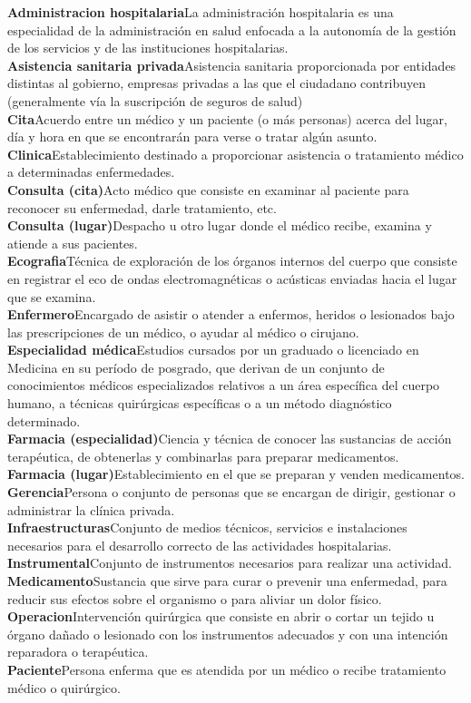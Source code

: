\documentclass[12pt,a4paper]{article}
\newcommand{\term}[2]{\textbf{#1}\quad#2\\}
\begin{document}
	\term{Administracion hospitalaria}{La administración hospitalaria es una especialidad de la administración en salud enfocada a la autonomía de la gestión de los servicios y de las instituciones hospitalarias.}
	\term{Asistencia sanitaria privada}{Asistencia sanitaria proporcionada por entidades distintas al gobierno, empresas privadas a las que el ciudadano contribuyen (generalmente vía la suscripción de seguros de salud)}
	\term{Cita}{Acuerdo entre un médico y un paciente (o más personas) acerca del lugar, día y hora en que se encontrarán para verse o tratar algún asunto.}
	\term{Clinica}{Establecimiento destinado a proporcionar asistencia o tratamiento médico a determinadas enfermedades.}
	\term{Consulta (cita)}{Acto médico que consiste en examinar al paciente para reconocer su enfermedad, darle tratamiento, etc.}
	\term{Consulta (lugar)}{Despacho u otro lugar donde el médico recibe, examina y atiende a sus pacientes.}
	\term{Ecografia}{Técnica de exploración de los órganos internos del cuerpo que consiste en registrar el eco de ondas electromagnéticas o acústicas enviadas hacia el lugar que se examina.}
	\term{Enfermero}{Encargado de asistir o atender a enfermos, heridos o lesionados bajo las prescripciones de un médico, o ayudar al médico o cirujano.}
	\term{Especialidad médica}{Estudios cursados por un graduado o licenciado en Medicina en su período de posgrado, que derivan de un conjunto de conocimientos médicos especializados relativos a un área específica del cuerpo humano, a técnicas quirúrgicas específicas o a un método diagnóstico determinado.}
	\term{Farmacia (especialidad)}{Ciencia y técnica de conocer las sustancias de acción terapéutica, de obtenerlas y combinarlas para preparar medicamentos.}
	\term{Farmacia (lugar)}{Establecimiento en el que se preparan y venden medicamentos.}
	\term{Gerencia}{Persona o conjunto de personas que se encargan de dirigir, gestionar o administrar la clínica privada.}
	\term{Infraestructuras}{Conjunto de medios técnicos, servicios e instalaciones necesarios para el desarrollo correcto de las actividades hospitalarias.}
	\term{Instrumental}{Conjunto de instrumentos necesarios para realizar una actividad.}
	\term{Medicamento}{Sustancia que sirve para curar o prevenir una enfermedad, para reducir sus efectos sobre el organismo o para aliviar un dolor físico.}
	\term{Operacion}{Intervención quirúrgica que consiste en abrir o cortar un tejido u órgano dañado o lesionado con los instrumentos adecuados y con una intención reparadora o terapéutica.}
	\term{Paciente}{Persona enferma que es atendida por un médico o recibe tratamiento médico o quirúrgico.}
\end{document}
